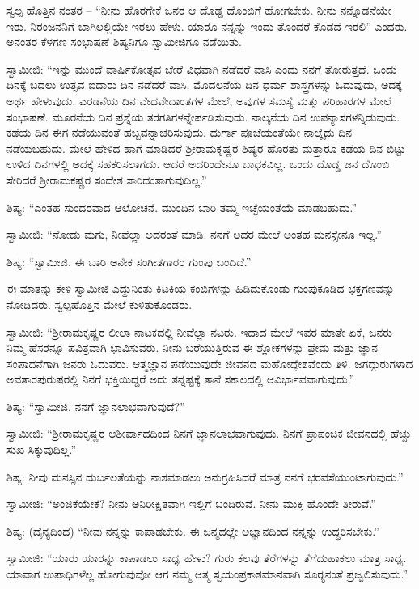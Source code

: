  ಸ್ವಲ್ಪ ಹೊತ್ತಿನ ನಂತರ – “ನೀನು ಹೊರಗೇಕೆ ಜನರ ಆ ದೊಡ್ಡ ದೊಂಬಿಗೆ ಹೋಗಬೇಕು. ನೀನು ನನ್ನೊಡನೆಯೇ ಇರು. ನಿರಂಜನನಿಗೆ ಬಾಗಿಲಲ್ಲಿಯೇ ಇರಲು ಹೇಳು. ಯಾರೂ ನನ್ನನ್ನು ಇಂದು ತೊಂದರೆ ಕೊಡದೆ ಇರಲಿ” ಎಂದರು. ಅನಂತರ ಕೆಳಗಣ ಸಂಭಾಷಣೆ ಶಿಷ್ಯನಿಗೂ ಸ್ವಾಮೀಜಿಗೂ ನಡೆಯಿತು. 

 ಸ್ವಾಮೀಜಿ: “ಇನ್ನು ಮುಂದೆ ವಾರ್ಷಿಕೋತ್ಸವ ಬೇರೆ ವಿಧವಾಗಿ ನಡೆದರೆ ವಾಸಿ ಎಂದು ನನಗೆ ತೋರುತ್ತದೆ. ಒಂದು ದಿನಕ್ಕೆ ಬದಲು ಉತ್ಸವ ಐದಾರು ದಿನ ನಡೆದರೆ ವಾಸಿ. ಮೊದಲನೆಯ ದಿನ ಧರ್ಮ ಶಾಸ್ತ್ರಗಳನ್ನು ಓದುವುದು, ಅದಕ್ಕೆ ಅರ್ಥ ಹೇಳುವುದು. ಎರಡನೆಯ ದಿನ ವೇದವೇದಾಂತಗಳ ಮೇಲೆ, ಅವುಗಳ ಸಮಸ್ಯೆ ಮತ್ತು ಪರಿಹಾರಗಳ ಮೇಲೆ ಸಂಭಾಷಣೆ. ಮೂರನೆಯ ದಿನ ಪ್ರಶ್ನೆಯ ತರಗತಿಗಳನ್ನೇರ್ಪಡಿಸುವುದು. ನಾಲ್ಕನೆಯ ದಿನ ಉಪನ್ಯಾಸಗಳನ್ನಿಡುವುದು. ಕಡೆಯ ದಿನ ಈಗ ನಡೆಯುವಂತೆ ಹಬ್ಬವನ್ನಾಚರಿಸುವುದು. ದುರ್ಗಾ ಪೂಜೆಯಂತೆಯೇ ನಾಲ್ಕೈದು ದಿನ ನಡೆಯಬಹುದು. ಮೇಲೆ ಹೇಳಿದ ಹಾಗೆ ಮಾಡಿದರೆ ಶ‍್ರೀರಾಮಕೃಷ್ಣರ ಶಿಷ್ಯರ ಹೊರತು ಮತ್ತಾರೂ ಕಡೆಯ ದಿನ ಬಿಟ್ಟು ಉಳಿದ ದಿನಗಳಲ್ಲಿ ಅದಕ್ಕೆ ಸಹಕರಿಸಲಾಗದು. ಆದರೆ ಅದರಿಂದೇನೂ ಬಾಧಕವಿಲ್ಲ. ಒಂದು ದೊಡ್ಡ ಜನ ದೊಂಬಿ ಸೇರಿದರೆ ಶ‍್ರೀರಾಮಕಷ್ಣರ ಸಂದೇಶ ಸಾರಿದಂತಾಗುವುದಿಲ್ಲ.” 

 ಶಿಷ್ಯ: “ಎಂತಹ ಸುಂದರವಾದ ಆಲೋಚನೆ. ಮುಂದಿನ ಬಾರಿ ತಮ್ಮ ಇಚ್ಛೆಯಂತೆಯೆ ಮಾಡಬಹುದು.” 

 ಸ್ವಾಮೀಜಿ: “ನೋಡು ಮಗು, ನೀವೆಲ್ಲಾ ಅದರಂತೆ ಮಾಡಿ. ನನಗೆ ಅದರ ಮೇಲೆ ಅಂತಹ ಮನಸ್ಸೇನೂ ಇಲ್ಲ.” 

 ಶಿಷ್ಯ: “ಸ್ವಾಮೀಜಿ. ಈ ಬಾರಿ ಅನೇಕ ಸಂಗೀತಗಾರರ ಗುಂಪು ಬಂದಿದೆ.” 

 ಈ ಮಾತನ್ನು ಕೇಳಿ ಸ್ವಾಮೀಜಿ ಎದ್ದುನಿಂತು ಕಿಟಕಿಯ ಕಂಬಿಗಳನ್ನು ಹಿಡಿದುಕೊಂಡು ಗುಂಪುಕೂಡಿದ ಭಕ್ತಗಣವನ್ನು ನೋಡಿದರು. ಸ್ವಲ್ಪಹೊತ್ತಿನ ಮೇಲೆ ಕುಳಿತುಕೊಂಡರು. 

 ಸ್ವಾಮೀಜಿ: “ಶ‍್ರೀರಾಮಕೃಷ್ಣರ ಲೀಲಾ ನಾಟಕದಲ್ಲಿ ನೀವೆಲ್ಲಾ ನಟರು. ಇದಾದ ಮೇಲೆ ಇವರ ಮಾತೇ ಏಕೆ, ಜನರು ನಿಮ್ಮ ಹೆಸರನ್ನೂ ಪವಿತ್ರವಾಗಿ ಭಾವಿಸುವರು. ನೀನು ಬರೆಯುತ್ತಿರುವ ಈ ಶ್ಲೋಕಗಳನ್ನು ಪ್ರೇಮ ಮತ್ತು ಜ್ಞಾನ ಸಂಪಾದನೆಗಾಗಿ ಜನರು ಓದುವರು. ಆತ್ಮಜ್ಞಾನ ಪಡೆಯುವುದೇ ಜೀವನದ ಮಹೋದ್ದೇಶವೆಂದು ತಿಳಿ. ಜಗದ್ಗುರುಗಳಾದ ಅವತಾರಪುರುಷರಲ್ಲಿ ನಿನಗೆ ಭಕ್ತಿಯಿದ್ದರೆ ಅದು ತನ್ನಷ್ಟಕ್ಕೆ ತಾನೆ ಸಕಾಲದಲ್ಲಿ ಆವಿರ್ಭಾವವಾಗುವುದು.” 

 ಶಿಷ್ಯ: “ಸ್ವಾಮೀಜಿ, ನನಗೆ ಜ್ಞಾನಲಾಭವಾಗುವುದೆ?” 

 ಸ್ವಾಮೀಜಿ: “ಶ‍್ರೀರಾಮಕೃಷ್ಣರ ಆಶೀರ್ವಾದದಿಂದ ನಿನಗೆ ಜ್ಞಾನಲಾಭವಾಗುವುದು. ನಿನಗೆ ಪ್ರಾಪಂಚಿಕ ಜೀವನದಲ್ಲಿ ಹೆಚ್ಚು ಸುಖ ಸಿಕ್ಕುವುದಿಲ್ಲ.” 

 ಶಿಷ್ಯ: ನೀವು ಮನಸ್ಸಿನ ದುರ್ಬಲತೆಯನ್ನು ನಾಶಮಾಡಲು ಅನುಗ್ರಹಿಸಿದರೆ ಮಾತ್ರ ನನಗೆ ಭರವಸೆಯುಂಟಾಗುವುದು.” 

\newpage

 ಸ್ವಾಮೀಜಿ: “ಅಂಜಿಕೆಯೇಕೆ? ನೀನು ಅನಿರೀಕ್ಷಿತವಾಗಿ ಇಲ್ಲಿಗೆ ಬಂದಿರುವೆ. ನೀನು ಮುಕ್ತಿ ಹೊಂದೇ ತೀರುವೆ.” 

 ಶಿಷ್ಯ: (ದೈನ್ಯದಿಂದ) “ನೀವು ನನ್ನನ್ನು ಕಾಪಾಡಬೇಕು. ಈ ಜನ್ಮದಲ್ಲೇ ಅಜ್ಞಾನದಿಂದ ನನ್ನನ್ನು ಉದ್ಧರಿಸಬೇಕು.” 

 ಸ್ವಾಮೀಜಿ: “ಯಾರು ಯಾರನ್ನು ಕಾಪಾಡಲು ಸಾಧ್ಯ ಹೇಳು? ಗುರು ಕೆಲವು ತೆರೆಗಳನ್ನು ತೆಗೆದುಹಾಕಲು ಮಾತ್ರ ಸಾಧ್ಯ. ಯಾವಾಗ ಉಪಾಧಿಗಳೆಲ್ಲ ಹೋಗುವುವೋ ಆಗ ನಮ್ಮ ಆತ್ಮ ಸ್ವಯಂಪ್ರಕಾಶಮಾನವಾಗಿ ಸೂರ‍್ಯನಂತೆ ಪ್ರಜ್ವಲಿಸುವುದು.” 

